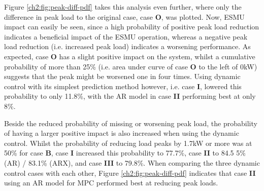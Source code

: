 

Figure \ref{ch2:fig:peak-diff-pdf} takes this analysis even further, where only the difference in peak load to the original case, case \textbf{O}, was plotted.
Now, ESMU impact can easily be seen, since a high probability of positive peak load reduction indicates a beneficial impact of the ESMU operation, whereas a negative peak load reduction (i.e. increased peak load) indicates a worsening performance.
As expected, case \textbf{O} has a slight positive impact on the system, whilst a cumulative probability of more than 25\% (i.e. area under curve of case \textbf{O} to the left of 0kW) suggests that the peak might be worsened one in four times.
Using dynamic control with its simplest prediction method however, i.e. case \textbf{I}, lowered this probability to only 11.8\%, with the AR model in case \textbf{II} performing best at only 8\%.

Beside the reduced probability of missing or worsening peak load, the probability of having a larger positive impact is also increased when using the dynamic control.
Whilst the probability of reducing load peaks by 1.7kW or more was at 50\% for case \textbf{B}, case \textbf{I} increased this probability to 77.7\%, case \textbf{II} to 84.5 5\% (AR) / 83.1\% (ARX), and case \textbf{III} to 79.8\%.
When comparing the three dynamic control cases with each other, Figure \ref{ch2:fig:peak-diff-pdf} indicates that case \textbf{II} using an AR model for MPC performed best at reducing peak loads.





